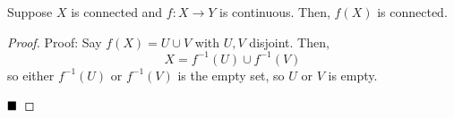 \begin{lemma}
    Suppose $X$ is connected and $f : X \to Y$ is continuous. Then, $f(X)$ is connected.
\end{lemma}
\begin{proof}{Proof:}
    Say $f(X) = U \cup V$ with $U, V$ disjoint. Then,
    \[ X = f^{-1}(U) \cup f^{-1}(V) \]
    so either $f^{-1}(U)$ or $f^{-1}(V)$ is the empty set, so $U$ or $V$ is empty.

    $\qed$
\end{proof}
